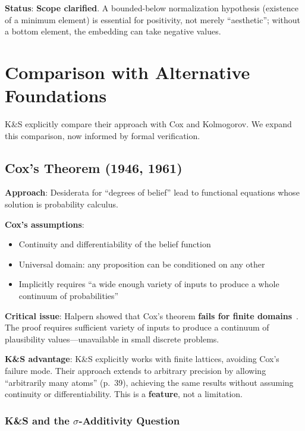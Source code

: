 \documentclass[11pt]{article}
\begin{document}
\textbf{Status}: \textbf{Scope clarified}. A bounded-below normalization hypothesis (existence of a minimum element)
is essential for positivity, not merely ``aesthetic''; without a bottom element, the embedding can take negative values.

\section{Comparison with Alternative Foundations}

K\&S explicitly compare their approach with Cox and Kolmogorov. We expand this
comparison, now informed by formal verification.

\subsection{Cox's Theorem (1946, 1961)}

\textbf{Approach}: Desiderata for ``degrees of belief'' lead to functional equations
whose solution is probability calculus.

\textbf{Cox's assumptions}:
\begin{itemize}[noitemsep]
\item Continuity and differentiability of the belief function
\item Universal domain: any proposition can be conditioned on any other
\item Implicitly requires ``a wide enough variety of inputs to produce a whole continuum
      of probabilities''
\end{itemize}

\textbf{Critical issue}: Halpern showed that Cox's theorem \textbf{fails for finite
domains}~\cite{halpern1999}. The proof requires sufficient variety of inputs to
produce a continuum of plausibility values---unavailable in small discrete problems.

\textbf{K\&S advantage}: K\&S explicitly works with finite lattices, avoiding Cox's
failure mode. Their approach extends to arbitrary precision by allowing ``arbitrarily
many atoms'' (p.~39), achieving the same results without assuming continuity or
differentiability. This is a \textbf{feature}, not a limitation.

\subsubsection{K\&S and the \texorpdfstring{$\sigma$}{sigma}-Additivity Question}
\label{sec:sigma-additivity}
\end{document}
